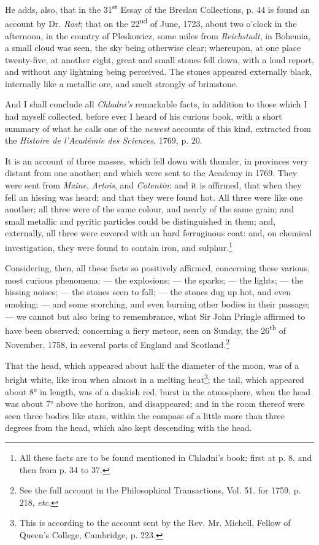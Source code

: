 \documentclass[a4paper, 12pt, oneside]{article}
\begin{document}
He adds, also, that in the 31\textsuperscript{st} Essay of the Breslau Collections, p. 44 is found an account by Dr. \emph{Rost}; that on the 22\textsuperscript{nd} of June, 1723, about two o'clock in the afternoon, in the country of Pleskowicz, some miles from \emph{Reichstadt}, in Bohemia, a small cloud was seen, the sky being otherwise clear; whereupon, at one place twenty-five, at another eight, great and small stones fell down, with a loud report, and without any lightning being perceived. The stones appeared externally black, internally like a metallic ore, and smelt strongly of brimstone.

And I shall conclude all \emph{Chladni's} remarkable facts, in addition to those which I had myself collected, before ever I heard of his curious book, with a short summary of what he calls one of the \emph{newest} accounts of this kind, extracted from the \emph{Histoire de l'Académie des Sciences}, 1769, p. 20.

It is an account of three masses, which fell down with thunder, in provinces very distant from one another; and which were sent to the Academy in 1769. They were sent from \emph{Maine}, \emph{Artois}, and \emph{Cotentin}: and it is affirmed, that when they fell an hissing was heard; and that they were found hot. All three were like one another; all three were of the same colour, and nearly of the same grain; and small metallic and pyritic particles could be distinguished in them; and, externally, all three were covered with an hard ferruginous coat: and, on chemical investigation, they were found to contain iron, and sulphur.\footnote{All these facts are to be found mentioned in Chladni's book; first at p. 8, and then from p. 34 to 37.}

Considering, then, all these facts so positively affirmed, concerning these various, most curious phenomena: --- the explosions; --- the sparks; --- the lights; --- the hissing noises; --- the stones seen to fall; --- the stones dug up hot, and even smoking; --- and some scorching, and even burning other bodies in their passage; --- we cannot but also bring to remembrance, what Sir John Pringle affirmed to have been observed; concerning a fiery meteor, seen on Sunday, the 26\textsuperscript{th} of November, 1758, in several parts of England and Scotland.\footnote{See the full account in the Philosophical Transactions, Vol. 51. for 1759, p. 218, \emph{etc.}}

That the head, which appeared about half the diameter of the moon, was of a bright white, like iron when almost in a melting heat\footnote{This is according to the account sent by the Rev. Mr. Michell, Fellow of Queen's College, Cambridge, p. 223.}; the tail, which appeared about 8° in length, was of a duskish red, burst in the atmosphere, when the head was about 7° above the horizon, and disappeared; and in the room thereof were seen three bodies like stars, within the compass of a little more than three degrees from the head, which also kept descending with the head.
\end{document}
